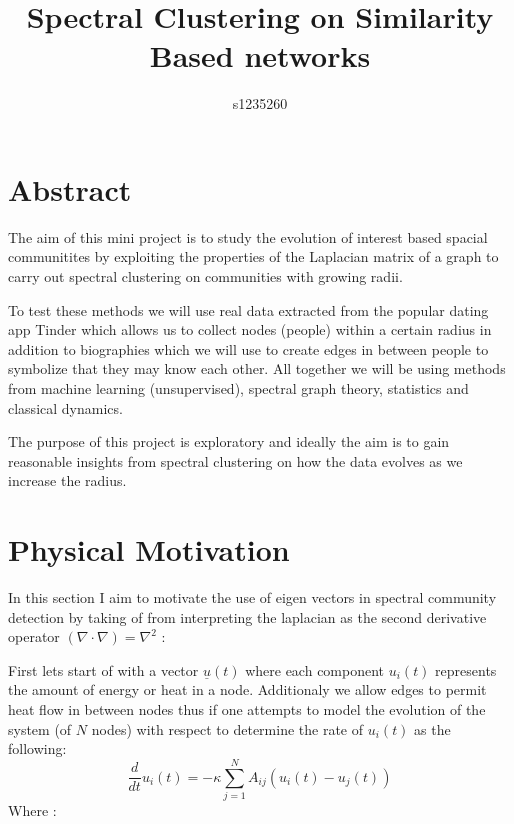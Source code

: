 \documentclass[10pt,twocolumn]{article}
\begin{document}
\title{Spectral Clustering on Similarity Based networks}
\author{s1235260}
\maketitle 




\section{Abstract}
The aim of this mini project is to study the evolution of interest based spacial communitites by exploiting the properties of the Laplacian matrix of a graph to carry out spectral clustering on communities with growing radii. 


 To test these methods we will use real data extracted from the popular dating app Tinder which allows us to collect nodes (people) within a certain radius in addition to biographies which we will use to create edges in between people to symbolize that they may know each other.
\newline
All together we will be using methods from machine learning (unsupervised), spectral graph theory, statistics and classical dynamics.

The purpose of this project is exploratory and ideally the aim is to gain reasonable insights from spectral clustering on how the data evolves as we increase the radius.

\section{Physical Motivation}
In this section I aim to motivate the use of eigen vectors in spectral community detection by
taking of from interpreting the laplacian as the second derivative operator $(\nabla \cdot \nabla) = \nabla^{2}$ :

First lets start of with a vector $\underline{u}(t)$
where each component $u_{i}(t)$ represents the amount of energy or heat in a node. Additionaly we allow edges to permit heat flow in between nodes thus if one attempts to model the evolution of the system (of $N$ nodes) with respect to determine the rate of $u_{i}(t)$  as the following:
\[
\frac{d}{dt}u_{i}(t) = -\kappa \sum_{j=1}^{N}A_{ij}(u_{i}(t) -u_{j}(t))
\]
Where :
\end{document}
